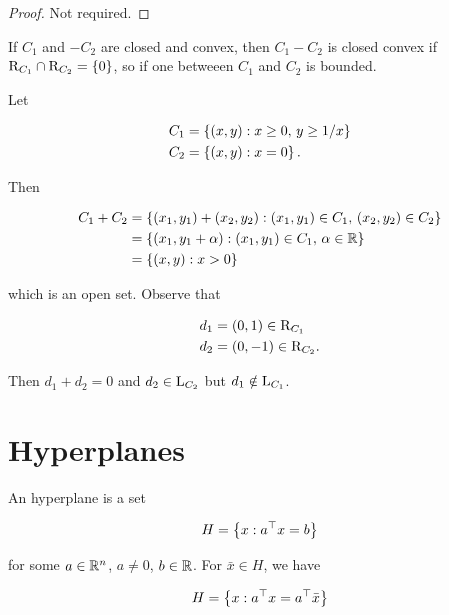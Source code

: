 \begin{proof}
    Not required.
\end{proof}

\begin{remark}
    
    If $C_1$ and $-C_2$ are closed and convex, then $C_1 - C_2$ is closed convex if $\mathrm{R}_{C_1} \cap \mathrm{R}_{C_2} = \left\{ 0 \right\}$, so if one betweeen $C_1$ and $C_2$ is bounded.

\end{remark}

\begin{example}
    
    Let 

    \begin{align*}
        C_1 &= \left\{ (x,y) : x \ge 0,\, y \ge 1/x \right\} \\
        C_2 &= \left\{ (x,y) : x = 0 \right\}.
    \end{align*}

    Then 

    \begin{align*}
        C_1 + C_2 &= \left\{ (x_1,y_1) + (x_2,y_2) : (x_1,y_1) \in C_1,\, (x_2,y_2) \in C_2 \right\} \\
            &= \left\{ (x_1,y_1 + \alpha) : (x_1,y_1) \in C_1,\, \alpha \in \mathbb{R} \right\} \\
            &= \left\{ (x,y) : x > 0 \right\} 
    \end{align*}

    which is an open set. Observe that 

    \begin{align*}
        d_1 &= (0,1) \in \mathrm{R}_{C_1} \\
        d_2 &= (0,-1) \in \mathrm{R}_{C_2}.
    \end{align*}

    Then $d_1 + d_2 = 0$ and $d_2 \in \mathrm{L}_{C_2}$ but $d_1 \notin \mathrm{L}_{C_1}$.

\end{example}

\section{Hyperplanes}

An hyperplane is a set 

\[ H = \left\{ x : a^\top x = b \right\} \]

for some $a \in {\mathbb{R}^n}$, $a \neq 0$, $b \in \mathbb{R}$. For $\bar{x} \in H$, we have 

\[ H = \left\{ x : a^\top x = a^\top \bar{x}  \right\} \]

